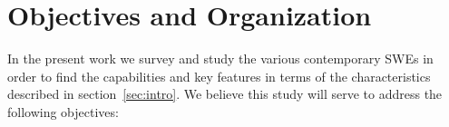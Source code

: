 \section{Objectives and Organization}


In the present work we survey and study the various contemporary SWEs in order
to find the capabilities and key features in terms of the characteristics
described in section~\ref{sec:intro}. We believe this study will serve to
address the following objectives:

